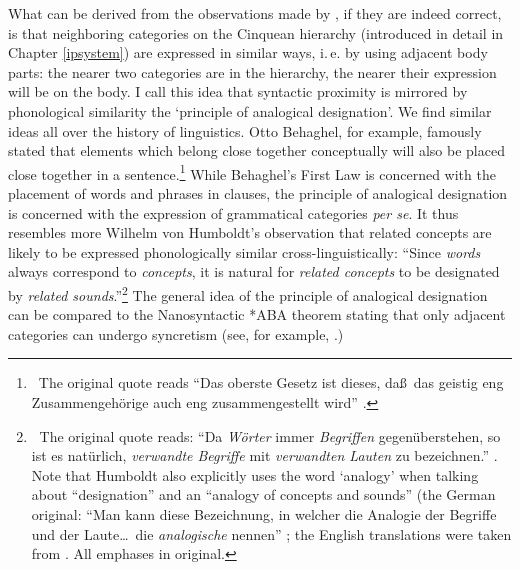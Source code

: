 \begin{savenotes}
\begin{theo}
\noindent What\label{analogicaldesignation} can be derived from the observations made by \citet{bross2017scope}, if they are indeed correct, is that neighboring categories on the Cinquean hierarchy (introduced in detail in Chapter \ref{ipsystem}) are expressed in similar ways, i.\,e. by using adjacent body parts: the nearer two categories are in the hierarchy, the nearer their expression will be on the body. I call this idea that syntactic proximity is mirrored by phonological similarity the `principle of analogical designation'. We find similar ideas all over the history of linguistics. Otto Behaghel, for example, famously stated that elements which belong close together conceptually will also be placed close together in a sentence.\footnote{ \, The original quote reads ``Das oberste Gesetz ist dieses, da\ss\ das geistig eng Zusammengeh\"orige auch eng zusammengestellt wird'' \citep[4]{behaghel1932}.} While Behaghel's First Law is concerned with the placement of words and phrases in clauses, the principle of analogical designation is concerned with the expression of grammatical categories \textit{per se}. It thus resembles more Wilhelm von Humboldt's observation that related concepts are likely to be expressed phonologically similar cross-linguistically: ``Since \textit{words} always correspond to \textit{concepts}, it is natural for \textit{related concepts} to be designated by \textit{related sounds}.''\footnote{ \textcolor{white}{n}The original quote reads: ``Da \textit{W\"orter} immer \textit{Begriffen} gegen\"uberstehen, so ist es nat\"urlich, \textit{verwandte Begriffe} mit \textit{verwandten Lauten} zu bezeichnen.'' \citet[75]{von1836kawi}. Note that Humboldt also explicitly uses the word `analogy' when talking about ``designation'' and an ``analogy of concepts and sounds'' (the German original: ``Man kann diese Bezeichnung, in welcher die Analogie der Begriffe und der Laute\dots\ die \textit{analogische} nennen'' \citet[81]{von1836kawi}; the English translations were taken from \citet{humboldt1999language}. All emphases in original. } The general idea of the principle of analogical designation can be compared to the Nanosyntactic *ABA theorem stating that only adjacent categories can undergo syncretism (see, for example, \citealt{bobalji2007comparative,bobalji2012universals,caha2009nanosyntax}.)


\end{theo}
\end{savenotes}
